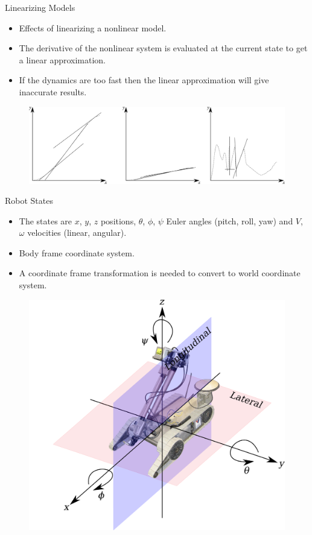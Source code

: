 \documentclass[hyperref={pdfpagelabels=false}]{beamer}
\begin{document}
\begin{frame}{Linearizing Models}
\begin{itemize}
\item Effects of linearizing a nonlinear model.
\item The derivative of the nonlinear system is evaluated at the current state to get a linear approximation.
\item If the dynamics are too fast then the linear approximation will give inaccurate results.
\end{itemize}
\begin{figure}[ht!]
    \centering
    \includegraphics[width=.9\textwidth]{images/KFLinearization2}
\end{figure}
\end{frame}

\begin{frame}{Robot States}
\begin{itemize}
\item The states are $x$, $y$, $z$ positions, $\theta$, $\phi$, $\psi$ Euler angles (pitch, roll, yaw) and $V$, $\omega$ velocities (linear, angular).
\item Body frame coordinate system.
\item A coordinate frame transformation is needed to convert to world coordinate system.
\end{itemize}
\begin{figure}[ht!]
    \centering
    \includegraphics[width=.5\textwidth]{images/packbotaxes}
\end{figure}
\end{frame}
\end{document}
